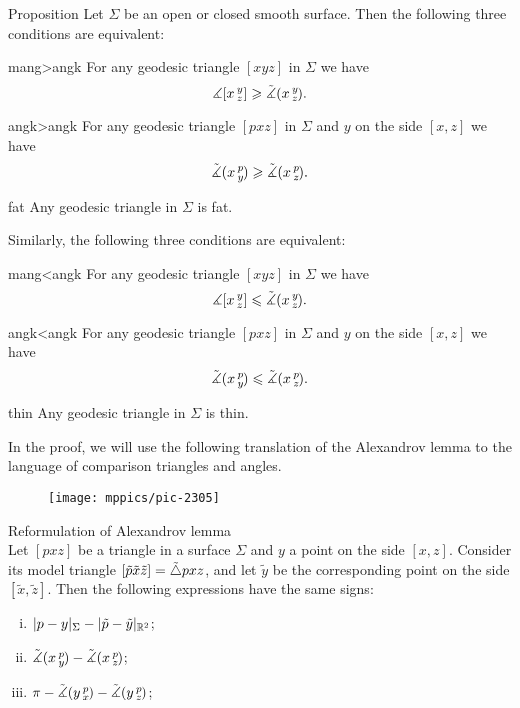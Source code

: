 \begin{thm}{Proposition}\label{prop:comp-reformulations}
Let $\Sigma$ be an open or closed smooth surface.
Then the following three conditions are equivalent:

\begin{subthm}{mang>angk}
For any geodesic triangle $[xyz]$ in $\Sigma$ we have
 \[\measuredangle[x\,{}^{y}_{z}]\geqslant\tilde\measuredangle(x\,{}^{y}_{z}\hspace{-0.2ex}).\]
\end{subthm}

\begin{subthm}{angk>angk} For any geodesic triangle $[pxz]$ in $\Sigma$ and $y$ on the side $[x,z]$ we have
 \[\tilde\measuredangle(x\,{}^{p}_{y}\hspace{-0.2ex}) \geqslant \tilde\measuredangle(x\,{}^{p}_{z}\hspace{-0.2ex}).\]
 
\end{subthm}

\begin{subthm}{fat}
 Any geodesic triangle in $\Sigma$ is fat.
\end{subthm}

\medskip

Similarly, the following three conditions are equivalent:

\begin{subthmA}{mang<angk}
For any geodesic triangle $[xyz]$ in $\Sigma$ we have
 \[\measuredangle[x\,{}^{y}_{z}]\leqslant\tilde\measuredangle(x\,{}^{y}_{z}\hspace{-0.2ex}).\]
\end{subthmA}

\begin{subthmA}{angk<angk} For any geodesic triangle $[pxz]$ in $\Sigma$ and $y$ on the side $[x,z]$ we have
 \[\tilde\measuredangle(x\,{}^{p}_{y}\hspace{-0.2ex}) \leqslant \tilde\measuredangle(x\,{}^{p}_{z}\hspace{-0.2ex}).\]
\end{subthmA}

\begin{subthmA}{thin}
Any geodesic triangle in $\Sigma$ is thin.
\end{subthmA}

\end{thm}

In the proof, we will use the following translation of the Alexandrov lemma to the language of comparison triangles and angles.

\begin{wrapfigure}{r}{25mm}
\vskip-0mm
\centering
\texttt{[image: mppics/pic-2305]}
\end{wrapfigure}

\begin{thm}{Reformulation of Alexandrov lemma}\label{lem:alex-reformulation}\\
Let $[pxz]$ be a triangle in a surface $\Sigma$
and $y$ a point on the side $[x,z]$.
Consider its model triangle $[\tilde p\tilde x\tilde z]\z=\tilde\triangle pxz$, and let $\tilde y$ be the corresponding point on the side $[\tilde x,\tilde z]$.
Then the following expressions have the same signs:
\begin{enumerate}[(i)]
 \item $\dist{p}{y}\Sigma-\dist{\tilde p}{\tilde y}{\mathbb{R}^2}$;
 \item $\tilde\measuredangle(x\,{}^{p}_{y}\hspace{-0.2ex})-\tilde\measuredangle(x\,{}^{p}_{z}\hspace{-0.2ex})$;
 \item $\pi-\tilde\measuredangle(y\,{}^{p}_{x}\hspace{-0.2ex})-\tilde\measuredangle(y\,{}^{p}_{z}\hspace{-0.2ex})$;
\end{enumerate}
\end{thm}

